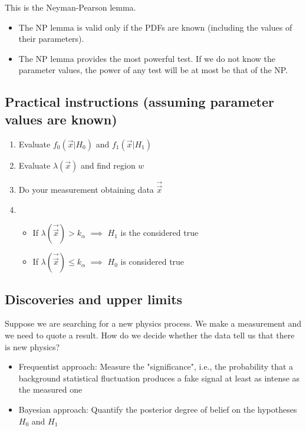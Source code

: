 This is the Neyman-Pearson lemma. 

\begin{itemize}[$\to$]
  \item The NP lemma is valid only if the PDFs are known (including the values of their parameters).
  \item The NP lemma provides the most powerful test. If we do not know the parameter values, the power of any test will be at most be that of the NP.

\end{itemize}

\subsection{Practical instructions (assuming parameter values are known)}
\begin{enumerate}
  \item Evaluate $f_0(\vec{x}|H_0)$ and $f_1(\vec{x}|H_1)$
  \item Evaluate $\lambda(\vec{x})$ and find region $w$
  \item Do your measurement obtaining data $\vec{\vec{x}}$ 
  \item \begin{itemize}
      \item If $\lambda(\vec{\vec{x}}) > k_\alpha$ $\implies$ $H_1$ is the considered true
      \item If $\lambda(\vec{\vec{x}}) \leq k_\alpha$ $\implies$ $H_0$ is considered true
  \end{itemize}
\end{enumerate}

\subsection{Discoveries and upper limits}
Suppose we are searching for a new physics process. We make a measurement and we need to quote a result. How do we decide whether the data tell us that there is new physics?

\begin{itemize}[$\to$]
  \item Frequentist approach: Measure the "significance", i.e., the probability that a background statistical fluctuation produces a fake signal at least as intense as the measured one
  \item Bayesian approach: Quantify the posterior degree of belief on the hypotheses $H_0$ and $H_1$
\end{itemize}

